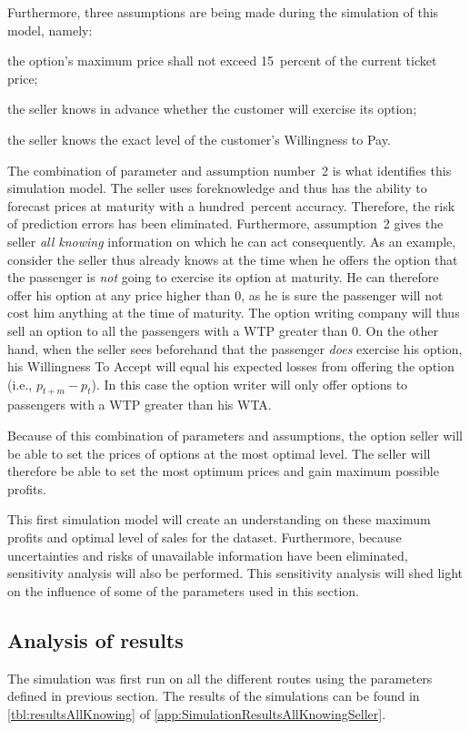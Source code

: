Furthermore, three assumptions are being made during the simulation of this model, namely:
\begin{compactenum}
\item the option's maximum price shall not exceed 15~percent of the current ticket price;
\item the seller knows in advance whether the customer will exercise its option;
\item the seller knows the exact level of the customer's Willingness to Pay.
\end{compactenum}


The combination of parameter and assumption number~2 is what identifies this simulation model. The seller uses foreknowledge and thus has the ability to forecast prices at maturity with a hundred~percent accuracy. Therefore, the risk of prediction errors has been eliminated. Furthermore, assumption~2 gives the seller \emph{all knowing} information on which he can act consequently. As an example, consider the seller thus already knows at the time when he offers the option that the passenger is \emph{not} going to exercise its option at maturity. He can therefore offer his option at any price higher than 0, as he is sure the passenger will not cost him anything at the time of maturity. The option writing company will thus sell an option to all the passengers with a WTP greater than 0. On the other hand, when the seller sees beforehand that the passenger \emph{does} exercise his option, his Willingness To Accept will equal his expected losses from offering the option (i.e., $p_{t+m} - p_t$). In this case the option writer will only offer options to passengers with a WTP greater than his WTA.

Because of this combination of parameters and assumptions, the option seller will be able to set the prices of options at the most optimal level. The seller will therefore be able to set the most optimum prices and gain maximum possible profits.

This first simulation model will create an understanding on these maximum profits and optimal level of sales for the dataset. Furthermore, because uncertainties and risks of unavailable information have been eliminated, sensitivity analysis will also be performed. This sensitivity analysis will shed light on the influence of some of the parameters used in this section.


\subsection{Analysis of results}
\label{subsec:AnalysisOfAllKnowing}
The simulation was first run on all the different routes using the parameters defined in previous section. The results of the simulations can be found in \autoref{tbl:resultsAllKnowing} of \autoref{app:SimulationResultsAllKnowingSeller}.

